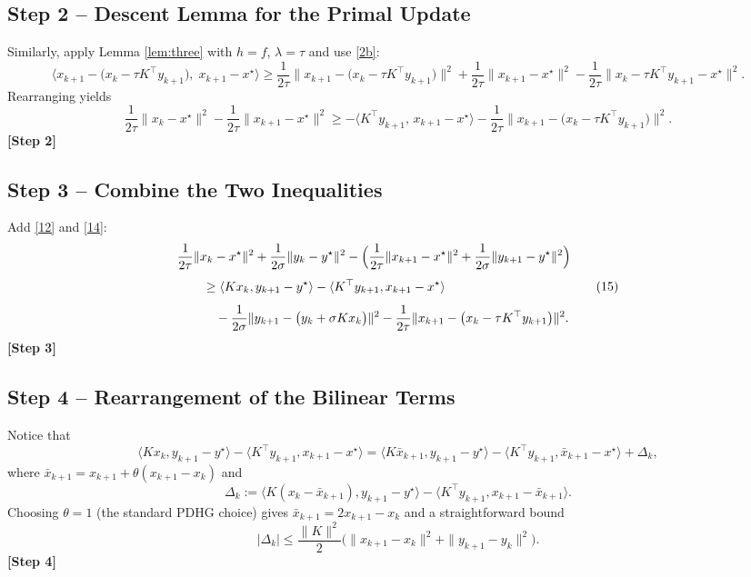 \documentclass[11pt]{article}
\begin{document}
\subsection*{Step 2 – Descent Lemma for the Primal Update}
Similarly, apply Lemma \ref{lem:three} with $h=f$, $\lambda=\tau$ and use \eqref{2b}:
\[
\langle x_{k+1}-\bigl(x_{k}-\tau K^{\top}y_{k+1}\bigr),\; x_{k+1}-x^{\star}\rangle
\ge\frac{1}{2\tau}\|x_{k+1}-\bigl(x_{k}-\tau K^{\top}y_{k+1}\bigr)\|^{2}
     +\frac{1}{2\tau}\|x_{k+1}-x^{\star}\|^{2}
     -\frac{1}{2\tau}\|x_{k}-\tau K^{\top}y_{k+1}-x^{\star}\|^{2}.
\tag{13}
\]
Rearranging yields
\[
\frac{1}{2\tau}\|x_{k}-x^{\star}\|^{2}
-\frac{1}{2\tau}\|x_{k+1}-x^{\star}\|^{2}
\ge -\langle K^{\top}y_{k+1},\, x_{k+1}-x^{\star}\rangle
     -\frac{1}{2\tau}\|x_{k+1}-\bigl(x_{k}-\tau K^{\top}y_{k+1}\bigr)\|^{2}.
\tag{14}
\]
\textbf{[Step 2]}

\subsection*{Step 3 – Combine the Two Inequalities}
Add \eqref{12} and \eqref{14}:
\[
\begin{aligned}
&\frac{1}{2\tau}\|x_{k}-x^{\star}\|^{2}
+\frac{1}{2\sigma}\|y_{k}-y^{\star}\|^{2}
-\Bigl(\frac{1}{2\tau}\|x_{k+1}-x^{\star}\|^{2}
      +\frac{1}{2\sigma}\|y_{k+1}-y^{\star}\|^{2}\Bigr)\\[4pt]
&\qquad\ge \langle Kx_{k},y_{k+1}-y^{\star}\rangle
          -\langle K^{\top}y_{k+1},x_{k+1}-x^{\star}\rangle\\[4pt]
&\qquad\quad -\frac{1}{2\sigma}\|y_{k+1}-\bigl(y_{k}+\sigma Kx_{k}\bigr)\|^{2}
          -\frac{1}{2\tau}\|x_{k+1}-\bigl(x_{k}-\tau K^{\top}y_{k+1}\bigr)\|^{2}.
\end{aligned}
\tag{15}
\]
\textbf{[Step 3]}

\subsection*{Step 4 – Rearrangement of the Bilinear Terms}
Notice that
\[
\langle Kx_{k},y_{k+1}-y^{\star}\rangle
-\langle K^{\top}y_{k+1},x_{k+1}-x^{\star}\rangle
=
\langle K\bar{x}_{k+1},y_{k+1}-y^{\star}\rangle
-\langle K^{\top}y_{k+1},\bar{x}_{k+1}-x^{\star}\rangle
+\Delta_{k},
\tag{16}
\]
where $\bar{x}_{k+1}=x_{k+1}+\theta(x_{k+1}-x_{k})$ and
\[
\Delta_{k}:=
\langle K(x_{k}-\bar{x}_{k+1}),y_{k+1}-y^{\star}\rangle
-\langle K^{\top}y_{k+1},x_{k+1}-\bar{x}_{k+1}\rangle.
\tag{17}
\]
Choosing $\theta=1$ (the standard PDHG choice) gives $\bar{x}_{k+1}=2x_{k+1}-x_{k}$ and a straightforward bound
\[
|\Delta_{k}|\le \frac{\|K\|^{2}}{2}\bigl(\|x_{k+1}-x_{k}\|^{2}+\|y_{k+1}-y_{k}\|^{2}\bigr).
\tag{18}
\]
\textbf{[Step 4]}
\end{document}
